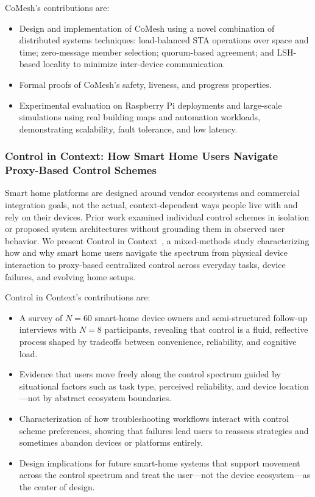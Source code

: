 CoMesh's contributions are:
\begin{itemize}
    \item Design and implementation of CoMesh using a novel combination of distributed systems techniques: load-balanced STA operations over space and time; zero-message member selection; quorum-based agreement; and LSH-based locality to minimize inter-device communication.
    \item Formal proofs of CoMesh's safety, liveness, and progress properties.
    \item Experimental evaluation on Raspberry Pi deployments and large-scale simulations using real building maps and automation workloads, demonstrating scalability, fault tolerance, and low latency.
\end{itemize}


\subsubsection{Control in Context: How Smart Home Users Navigate Proxy-Based Control Schemes}
\label{intro:sec:cic}

Smart home platforms are designed around vendor ecosystems and commercial integration goals, not the actual, context-dependent ways people live with and rely on their devices. Prior work examined individual control schemes in isolation or proposed system architectures without grounding them in observed user behavior. We present Control in Context~\cite{controlincontext}, a mixed-methods study characterizing how and why smart home users navigate the spectrum from physical device interaction to proxy-based centralized control across everyday tasks, device failures, and evolving home setups.

Control in Context's contributions are:
\begin{itemize}
    \item A survey of $N=60$ smart-home device owners and semi-structured follow-up interviews with $N=8$ participants, revealing that control is a fluid, reflective process shaped by tradeoffs between convenience, reliability, and cognitive load.
    \item Evidence that users move freely along the control spectrum guided by situational factors such as task type, perceived reliability, and device location---not by abstract ecosystem boundaries.
    \item Characterization of how troubleshooting workflows interact with control scheme preferences, showing that failures lead users to reassess strategies and sometimes abandon devices or platforms entirely.
    \item Design implications for future smart-home systems that support movement across the control spectrum and treat the user---not the device ecosystem---as the center of design.
\end{itemize}


